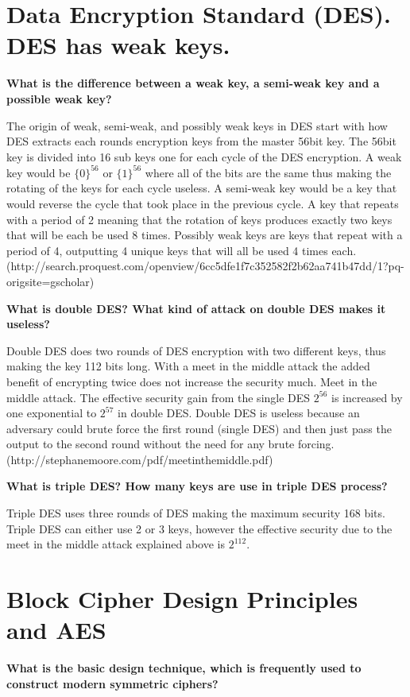 \documentclass[letterpaper,11pt,notitlepage,fleqn]{article}
\begin{document}
\section{Data Encryption Standard (DES). DES has weak keys.}
\noindent \textbf{What is the difference between a weak key, a semi-weak key and a possible weak key?}

The origin of weak, semi-weak, and possibly weak keys in DES start with how DES extracts each rounds encryption keys from the master 56bit key. The 56bit key is divided into 16 sub keys one for each cycle of the DES encryption. A weak key would be $\lbrace0\rbrace^{56}$ or $\lbrace1\rbrace^{56}$ where all of the bits are the same thus making the rotating of the keys for each cycle useless. A semi-weak key would be a key that would reverse the cycle that took place in the previous cycle. A
key that repeats with a period of 2 meaning that the rotation of keys produces exactly two keys that will be each be used 8 times. Possibly weak keys are keys that repeat with a period of 4, outputting 4 unique keys that will all be used 4 times each. (http://search.proquest.com/openview/6cc5dfe1f7c352582f2b62aa741b47dd/1?pq-origsite=gscholar) 

\noindent \textbf{What is double DES?  What kind of attack on double DES makes it useless?}

Double DES does two rounds of DES encryption with two different keys, thus making the key 112 bits long. With a meet in the middle attack the added benefit of encrypting twice does not increase the security much. 
Meet in the middle attack. The effective security gain from the single DES $2^{56}$ is increased by one exponential to $2^{57}$ in double DES. Double DES is useless because an adversary could brute force the first round (single DES) and then just pass the output to the second round without the need for any brute forcing. (http://stephanemoore.com/pdf/meetinthemiddle.pdf)

\noindent \textbf{What is triple DES?  How many keys are use in triple DES process?}

Triple DES uses three rounds of DES making the maximum security 168 bits. Triple DES can either use 2 or 3 keys, however the effective security due to the meet in the middle attack explained above is $2^{112}$. 



\section{Block Cipher Design Principles and AES}
\noindent \textbf{What is the basic design  technique,  which  is  frequently  used  to  construct  modern symmetric ciphers?}
\end{document}
